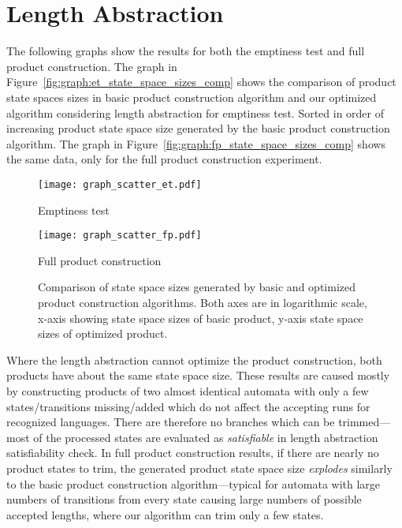 \section{Length Abstraction}

The following graphs show the results for both the emptiness test and full product construction. The graph in Figure~\ref{fig:graph:et_state_space_sizes_comp} shows the comparison of product state spaces sizes in basic product construction algorithm and our optimized algorithm considering length abstraction for emptiness test. Sorted in order of increasing product state space size generated by the basic product construction algorithm. The graph in Figure~\ref{fig:graph:fp_state_space_sizes_comp} shows the same data, only for the full product construction experiment.

\begin{figure*}[ht]
    \centering
    \begin{minipage}{0.49\linewidth}
        \centering
        \texttt{[image: graph\_scatter\_et.pdf]}
        \caption{Emptiness test}
        \label{fig:graph:et_state_space_sizes_comp}
    \end{minipage}
    \hfill
    \begin{minipage}{0.49\linewidth}
        \centering
        \texttt{[image: graph\_scatter\_fp.pdf]}
        \caption{Full product construction}
        \label{fig:graph:fp_state_space_sizes_comp}
    \end{minipage}
    \vspace{0.5cm}
    \caption{Comparison of state space sizes generated by basic and optimized product construction algorithms. Both axes are in logarithmic scale, x-axis showing state space sizes of basic product, y-axis state space sizes of optimized product.}
    \label{fig:graph:product_state_space_sizes}
\end{figure*}

Where the length abstraction cannot optimize the product construction, both products have about the same state space size. These results are caused mostly by constructing products of two almost identical automata with only a few states/transitions missing/added which do not affect the accepting runs for recognized languages. There are therefore no branches which can be trimmed---most of the processed states are evaluated as \emph{satisfiable} in length abstraction satisfiability check. In full product construction results, if there are nearly no product states to trim, the generated product state space size \emph{explodes} similarly to the basic product construction algorithm---typical for automata with large numbers of transitions from every state causing large numbers of possible accepted lengths, where our algorithm can trim only a few states.


